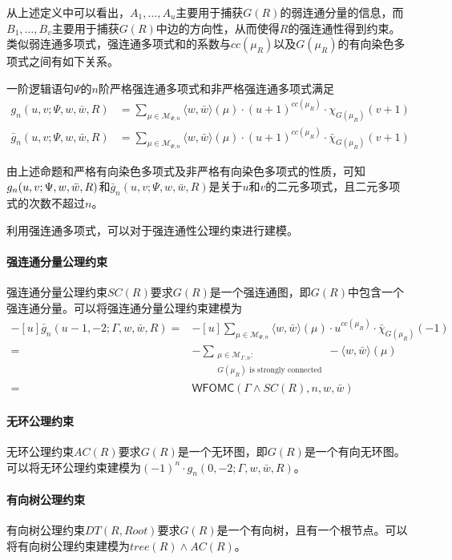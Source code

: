 \documentclass[12pt,UTF8,AutoFakeBold=3,a4paper]{ctexart} %
\newcommand{\sentence}{\Gamma}
\newcommand{\weight}{w}
\newcommand{\negweight}{\bar{w}}
\newcommand{\symwfomc}{\ensuremath{\mathsf{WFOMC}}}
\newcommand{\fomodels}[2]{\mathcal{M}_{#1, #2}}
\newcommand{\typeweight}[1]{\langle \weight, \negweight\rangle(#1)}
\begin{document}
从上述定义中可以看出，$A_1, \dots, A_u$主要用于捕获$G(R)$的弱连通分量的信息，而$B_1, \dots, B_v$主要用于捕获$G(R)$中边的方向性，从而使得$R$的强连通性得到约束。
类似弱连通多项式，强连通多项式和的系数与$cc(\mu_R)$以及$G(\mu_R)$的有向染色多项式之间有如下关系。
\begin{proposition}\label{prop:scp}
  一阶逻辑语句$\Psi$的$n$阶严格强连通多项式和非严格强连通多项式满足
  \begin{align*}
  g_n(u,v;\Psi, \weight, \negweight, R) &= \sum_{\mu \in \fomodels{\Psi}{n}} \typeweight{\mu} \cdot (u+1)^{cc(\mu_R)} \cdot \chi_{G(\mu_R)}(v+1) \\
  \bar g_n(u,v;\Psi, \weight, \negweight, R) &= \sum_{\mu \in \fomodels{\Psi}{n}} \typeweight{\mu} \cdot (u+1)^{cc(\mu_R)} \cdot \bar \chi_{G(\mu_R)}(v+1)
  \end{align*}
\end{proposition}
由上述命题和严格有向染色多项式及非严格有向染色多项式的性质，可知$g_n(u,v;\linebreak \Psi, \weight, \negweight, R)$和$\bar g_n(u,v;\Psi, \weight, \negweight, R)$是关于$u$和$v$的二元多项式，且二元多项式的次数不超过$n$。

利用强连通多项式，可以对于强连通性公理约束进行建模。
\paragraph{强连通分量公理约束} 强连通分量公理约束$SC(R)$要求$G(R)$是一个强连通图，即$G(R)$中包含一个强连通分量。可以将强连通分量公理约束建模为
\begin{align*}
    -[u]\bar g_{n}(u-1, -2; \sentence, \weight, \negweight, R)
    =& -[u]\sum_{\mu \in \fomodels{\Psi}{n}} \typeweight{\mu} \cdot u^{cc(\mu_R)} \cdot \bar \chi_{G(\mu_R)}(-1) \\
    =& -\sum_{\substack{\mu \in \fomodels{\sentence}{n}: \\ G(\mu_R)\text{ is strongly connected}}} -\typeweight{\mu} \\
    =& \symwfomc(\sentence \land SC(R), n, \weight, \negweight)
\end{align*}

\paragraph{无环公理约束} 无环公理约束$AC(R)$要求$G(R)$是一个无环图，即$G(R)$是一个有向无环图。可以将无环公理约束建模为$(-1)^n \cdot g_{n}(0, -2; \sentence, \weight, \negweight, R)$。

\paragraph{有向树公理约束} 有向树公理约束$DT(R, Root)$要求$G(R)$是一个有向树，且有一个根节点。可以将有向树公理约束建模为$tree(R)\land AC(R)$。
\end{document}
